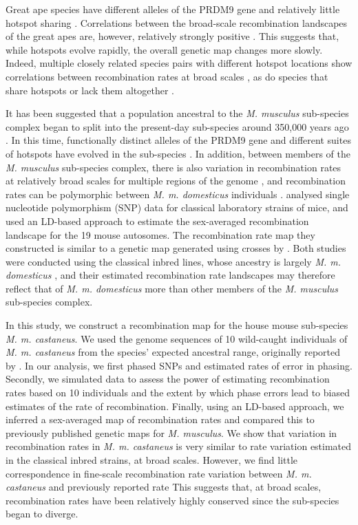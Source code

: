 Great ape species have different alleles of the PRDM9 gene \citep{RN264} and relatively little hotspot sharing \citep{RN214, RN221}. Correlations between the broad-scale recombination landscapes of the great apes are, however, relatively strongly positive \citep{RN42,RN221}. This suggests that, while hotspots evolve rapidly, the overall genetic map changes more slowly. Indeed, multiple closely related species pairs with different hotspot locations show correlations between recombination rates at broad scales \citep{RN174}, as do species that share hotspots or lack them altogether \citep{RN258,RN259}.
 
It has been suggested that a population ancestral to the \emph{M. musculus} sub-species complex began to split into the present-day sub-species around 350,000 years ago \citep{RN315}. In this time, functionally distinct alleles of the PRDM9 gene and different suites of hotspots have evolved in the sub-species \citep{RN249}. In addition, between members of the \emph{M. musculus} sub-species complex, there is also variation in recombination rates at relatively broad scales for multiple regions of the genome \citep{RN244}, and recombination rates can be polymorphic between \emph{M. m. domesticus} individuals \citep{RN267}. \cite{RN156} analysed single nucleotide polymorphism (SNP) data for classical laboratory strains of mice, and used an LD-based approach to estimate the sex-averaged recombination landscape for the 19 mouse autosomes. The recombination rate map they constructed is similar to a genetic map generated using crosses by \cite{RN232}. Both studies were conducted using the classical inbred lines, whose ancestry is largely \emph{M. m. domesticus} \citep{RN243}, and their estimated recombination rate landscapes may therefore reflect that of \emph{M. m. domesticus} more than other members of the \emph{M. musculus} sub-species complex.
 
In this study, we construct a recombination map for the house mouse sub-species \emph{M. m. castaneus}. We used the genome sequences of 10 wild-caught individuals of \emph{M. m. castaneus} from the species’ expected ancestral range, originally reported by \cite{RN122}. In our analysis, we first phased SNPs and estimated rates of error in phasing. Secondly, we simulated data to assess the power of estimating recombination rates based on 10 individuals and the extent by which phase errors lead to biased estimates of the rate of recombination. Finally, using an LD-based approach, we inferred a sex-averaged map of recombination rates and compared this to previously published genetic maps for \textit{M. musculus}. We show that variation in recombination rates in \emph{M. m. castaneus} is very similar to rate variation estimated in the classical inbred strains, at broad scales. However, we find little correspondence in fine-scale recombination rate variation between \emph{M. m. castaneus} and previously reported rate This suggests that, at broad scales, recombination rates have been relatively highly conserved since the sub-species began to diverge.

